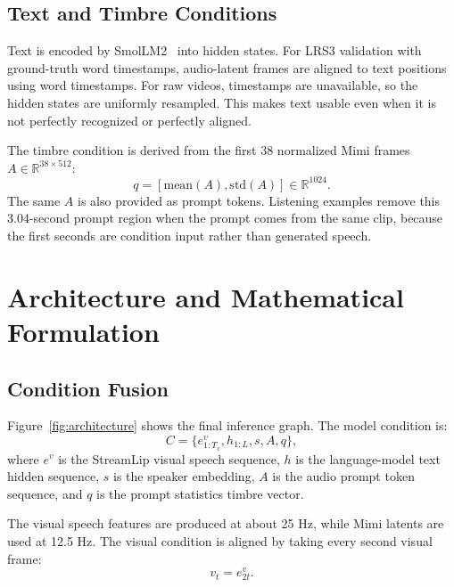 \documentclass{article}
\begin{document}
\subsection{Text and Timbre Conditions}

Text is encoded by SmolLM2~\cite{benallal2025smollm2} into hidden states. For LRS3 validation with
ground-truth word timestamps, audio-latent frames are aligned to text positions
using word timestamps. For raw videos, timestamps are unavailable, so the hidden
states are uniformly resampled. This makes text usable even when it is not
perfectly recognized or perfectly aligned.

The timbre condition is derived from the first 38 normalized Mimi frames
$A \in \mathbb{R}^{38 \times 512}$:
\begin{equation}
    q = [\mathrm{mean}(A), \mathrm{std}(A)] \in \mathbb{R}^{1024}.
\end{equation}
The same $A$ is also provided as prompt tokens. Listening examples remove this
3.04-second prompt region when the prompt comes from the same clip, because the
first seconds are condition input rather than generated speech.

\section{Architecture and Mathematical Formulation}

\subsection{Condition Fusion}

Figure~\ref{fig:architecture} shows the final inference graph. The model
condition is:
\begin{equation}
    C = \{e^v_{1:T_v}, h_{1:L}, s, A, q\},
\end{equation}
where $e^v$ is the StreamLip visual speech sequence, $h$ is the language-model
text hidden sequence, $s$ is the speaker embedding, $A$ is the audio prompt
token sequence, and $q$ is the prompt statistics timbre vector.

The visual speech features are produced at about 25 Hz, while Mimi latents are
used at 12.5 Hz. The visual condition is aligned by taking every second visual
frame:
\begin{equation}
    v_t = e^v_{2t}.
\end{equation}
\end{document}
